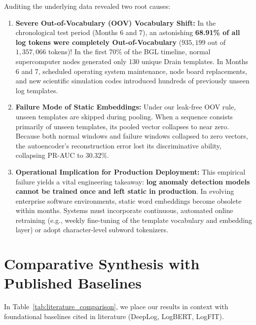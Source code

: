 Auditing the underlying data revealed two root causes:
\begin{enumerate}
    \item \textbf{Severe Out-of-Vocabulary (OOV) Vocabulary Shift:} In the chronological test period (Months 6 and 7), an astonishing \textbf{68.91\% of all log tokens were completely Out-of-Vocabulary} ($935,199$ out of $1,357,066$ tokens)! In the first 70\% of the BGL timeline, normal supercomputer nodes generated only 130 unique Drain templates. In Months 6 and 7, scheduled operating system maintenance, node board replacements, and new scientific simulation codes introduced hundreds of previously unseen log templates.
    \item \textbf{Failure Mode of Static Embeddings:} Under our leak-free OOV rule, unseen templates are skipped during pooling. When a sequence consists primarily of unseen templates, its pooled vector collapses to near zero. Because both normal windows and failure windows collapsed to zero vectors, the autoencoder's reconstruction error lost its discriminative ability, collapsing PR-AUC to $30.32\%$.
    \item \textbf{Operational Implication for Production Deployment:} This empirical failure yields a vital engineering takeaway: \textbf{log anomaly detection models cannot be trained once and left static in production}. In evolving enterprise software environments, static word embeddings become obsolete within months. Systems must incorporate continuous, automated online retraining (e.g., weekly fine-tuning of the template vocabulary and embedding layer) or adopt character-level subword tokenizers.
\end{enumerate}

\section{Comparative Synthesis with Published Baselines}
\label{sec:results_comparative_synthesis}
In Table~\ref{tab:literature_comparison}, we place our results in context with foundational baselines cited in literature (DeepLog, LogBERT, LogFIT).


